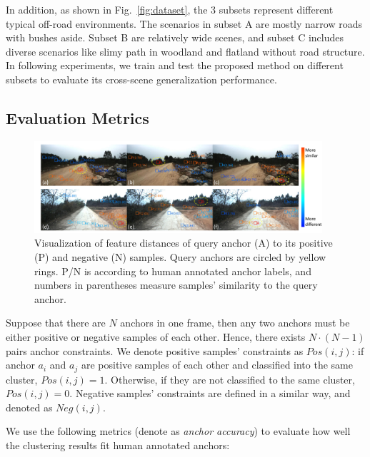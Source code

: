 \documentclass[letterpaper, 10 pt, conference]{ieeeconf}  %
\begin{document}
In addition, as shown in Fig.~\ref{fig:dataset}, the 3 subsets represent different typical off-road environments. The scenarios in subset A are mostly narrow roads with bushes aside. Subset B are relatively wide scenes, and subset C includes diverse scenarios like slimy path in woodland and flatland without road structure. In following experiments, we train and test the proposed method on different subsets to evaluate its cross-scene generalization performance.


\subsection{Evaluation Metrics}

\begin{figure}[]
	\centering
	\includegraphics[width=0.95\textwidth]{anchor_dis.pdf}
	\caption{Visualization of feature distances of query anchor (A) to its positive (P) and negative (N) samples. Query anchors are circled by yellow rings. P/N is according to human annotated anchor labels, and numbers in parentheses measure samples' similarity to the query anchor.}
	\label{fig:anchor_dis}
\end{figure}

Suppose that there are $N$ anchors in one frame, then any two anchors must be either positive or negative samples of each other. Hence, there exists $N \cdot(N-1)$ pairs anchor constraints.
We denote positive samples' constraints as $Pos(i,j)$: if anchor $a_i$ and $a_j$ are positive samples of each other and classified into the same cluster, $Pos(i,j)=1$. Otherwise, if they are not classified to the same cluster, $Pos(i,j)=0$.
Negative samples' constraints are defined in a similar way, and denoted as $Neg(i,j)$.

We use the following metrics (denote as \textit{anchor accuracy}) to evaluate how well the clustering results fit human annotated anchors:
\end{document}
